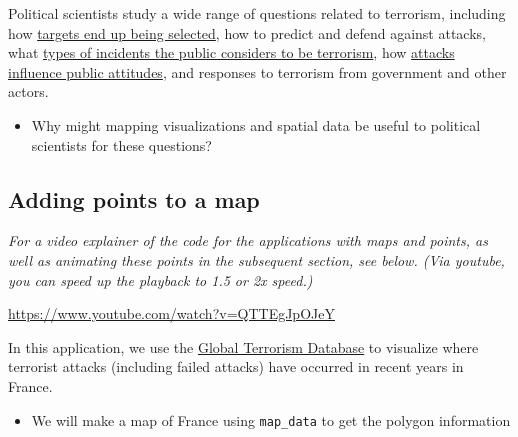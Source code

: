 \documentclass[
  letterpaper,
  DIV=11,
  numbers=noendperiod]{scrreprt}
\providecommand{\tightlist}{%
  \setlength{\itemsep}{0pt}\setlength{\parskip}{0pt}}\usepackage{longtable,booktabs,array}
\begin{document}
Political scientists study a wide range of questions related to
terrorism, including how
\href{https://doi.org/10.1080/19361610902929990}{targets end up being
selected}, how to predict and defend against attacks, what
\href{https://doi.org/10.1111/ajps.12329}{types of incidents the public
considers to be terrorism}, how
\href{https://static1.squarespace.com/static/5da3488403dd2c4493a888d0/t/61600a72d794ed74cf58e0f3/1633684109226/Godefroidt_2021_Manuscript.pdf}{attacks
influence public attitudes}, and responses to terrorism from government
and other actors.

\begin{itemize}
\tightlist
\item
  Why might mapping visualizations and spatial data be useful to
  political scientists for these questions?
\end{itemize}

\hypertarget{adding-points-to-a-map}{%
\subsection{Adding points to a map}\label{adding-points-to-a-map}}

\emph{For a video explainer of the code for the applications with maps
and points, as well as animating these points in the subsequent section,
see below. (Via youtube, you can speed up the playback to 1.5 or 2x
speed.)}

\url{https://www.youtube.com/watch?v=QTTEgJpOJeY}

In this application, we use the
\href{https://www.start.umd.edu/gtd/}{Global Terrorism Database} to
visualize where terrorist attacks (including failed attacks) have
occurred in recent years in France.

\begin{itemize}
\tightlist
\item
  We will make a map of France using \texttt{map\_data} to get the
  polygon information
\end{itemize}
\end{document}
